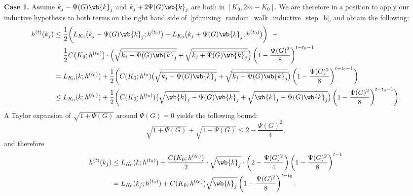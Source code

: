 	\textbf{Case 1.}
	Assume $k_j - \Psi(G) \wb{k}_j$ and $k_j + 2 \Psi(G) \wb{k}_j$ are both in $[K_0,2m  - K_0]$. We are therefore in a position to apply our inductive hypothesis to both terms on the right hand side of~\eqref{pf:mixing_random_walk_inductive_step_h}, and obtain the following:
	\begin{align*}
	h^{(t)}(k_j) & \leq \frac{1}{2}\biggl(L_{K_0}\bigl(k_j - \Psi(G) \wb{k}_j; h^{(t_0)}\bigr) + L_{K_0}\bigl(k_j + \Psi(G) \wb{k}_j; h^{(t_0)}\bigr) \biggr) ~~+ \\
	& \quad~ \frac{1}{2}C\bigl(K_0; h^{(t_0)}\bigr) \cdot \Bigl(\sqrt{\overline{k_j - \Psi(G) \wb{k}_j}} + \sqrt{\overline{k_j + \Psi(G) \wb{k}_j}}\Bigr)\left(1 - \frac{\Psi(G)^2}{8}\right)^{t-t_0 - 1} \\
	& = L_{K_0}(k;h^{(t_0)}) + \frac{1}{2}\biggl(C(K_0;h^{t_0})\bigl(\sqrt{\overline{k_j - \Psi(G) \wb{k}_j}} + \sqrt{\overline{k_j + \Psi(G) \wb{k}_j}}\bigr)\left(1 - \frac{\Psi(G)^2}{8}\right)^{t-t_0 - 1} \biggr) \\
	& \leq L_{K_0}(k;h^{(t_0)}) + \frac{1}{2}\biggl(C(K_0;h^{(t_0)})\bigl(\sqrt{\wb{k}_j - \Psi(G) \wb{k}_j} + \sqrt{\wb{k}_j + \Psi(G) \wb{k}_j}\bigr)\left(1 - \frac{\Psi(G)^2}{8}\right)^{t-t_0 - 1} \biggr).
	\end{align*}
	A Taylor expansion of $\sqrt{1 + \Psi(G)}$ around $\Psi(G) = 0$ yields the following bound:
	\begin{equation*}
	\sqrt{1 + \Psi(G)} + \sqrt{1 - \Psi(G)} \leq 2 - \frac{\Psi(G)^2}{4},
	\end{equation*}
	and therefore
	\begin{align*}
	h^{(t)}(k_j) & \leq L_{K_0}(k;h^{(t_0)}) + \frac{C(K_0;h^{(t_0)})}{2}\cdot \sqrt{\wb{k}_j}\cdot\left(2 - \frac{\Psi(G)^2}{4}\right)\left(1 - \frac{\Psi(G)^2}{8}\right)^{t-1} \\
	&= L_{K_0}(k_j;h^{(t_0)}) + C(K_0;h^{(t_0)})\sqrt{\wb{k}_j}\left(1 - \frac{\Psi(G)^2}{8}\right)^{t - t_0}.
	\end{align*}
	
